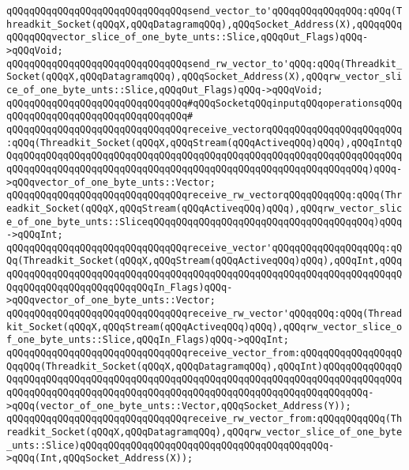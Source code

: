 \verb|qQQqqQQqqQQqqQQqqQQqqQQqqQQqqQQqsend_vector_to'qQQqqQQqqQQqqQQq:qQQq(Threadkit_Socket(qQQqX,qQQqDatagramqQQq),qQQqSocket_Address(X),qQQqqQQqqQQqqQQqvector_slice_of_one_byte_unts::Slice,qQQqOut_Flags)qQQq->qQQqVoid;|\newline
\verb|qQQqqQQqqQQqqQQqqQQqqQQqqQQqqQQqsend_rw_vector_to'qQQq:qQQq(Threadkit_Socket(qQQqX,qQQqDatagramqQQq),qQQqSocket_Address(X),qQQqrw_vector_slice_of_one_byte_unts::Slice,qQQqOut_Flags)qQQq->qQQqVoid;|\newline
\newline
\verb|qQQqqQQqqQQqqQQqqQQqqQQqqQQqqQQq#qQQqSocketqQQqinputqQQqoperationsqQQq|\newline
\verb|qQQqqQQqqQQqqQQqqQQqqQQqqQQqqQQq#|\newline
\verb|qQQqqQQqqQQqqQQqqQQqqQQqqQQqqQQqreceive_vectorqQQqqQQqqQQqqQQqqQQqqQQq:qQQq(Threadkit_Socket(qQQqX,qQQqStream(qQQqActiveqQQq)qQQq),qQQqIntqQQqqQQqqQQqqQQqqQQqqQQqqQQqqQQqqQQqqQQqqQQqqQQqqQQqqQQqqQQqqQQqqQQqqQQqqQQqqQQqqQQqqQQqqQQqqQQqqQQqqQQqqQQqqQQqqQQqqQQqqQQqqQQqqQQqqQQq)qQQq->qQQqvector_of_one_byte_unts::Vector;|\newline
\verb|qQQqqQQqqQQqqQQqqQQqqQQqqQQqqQQqreceive_rw_vectorqQQqqQQqqQQq:qQQq(Threadkit_Socket(qQQqX,qQQqStream(qQQqActiveqQQq)qQQq),qQQqrw_vector_slice_of_one_byte_unts::SliceqQQqqQQqqQQqqQQqqQQqqQQqqQQqqQQqqQQqqQQq)qQQq->qQQqInt;|\newline
\verb|qQQqqQQqqQQqqQQqqQQqqQQqqQQqqQQqreceive_vector'qQQqqQQqqQQqqQQqqQQq:qQQq(Threadkit_Socket(qQQqX,qQQqStream(qQQqActiveqQQq)qQQq),qQQqInt,qQQqqQQqqQQqqQQqqQQqqQQqqQQqqQQqqQQqqQQqqQQqqQQqqQQqqQQqqQQqqQQqqQQqqQQqqQQqqQQqqQQqqQQqqQQqqQQqqQQqIn_Flags)qQQq->qQQqvector_of_one_byte_unts::Vector;|\newline
\verb|qQQqqQQqqQQqqQQqqQQqqQQqqQQqqQQqreceive_rw_vector'qQQqqQQq:qQQq(Threadkit_Socket(qQQqX,qQQqStream(qQQqActiveqQQq)qQQq),qQQqrw_vector_slice_of_one_byte_unts::Slice,qQQqIn_Flags)qQQq->qQQqInt;|\newline
\newline
\verb|qQQqqQQqqQQqqQQqqQQqqQQqqQQqqQQqreceive_vector_from:qQQqqQQqqQQqqQQqqQQqqQQq(Threadkit_Socket(qQQqX,qQQqDatagramqQQq),qQQqInt)qQQqqQQqqQQqqQQqqQQqqQQqqQQqqQQqqQQqqQQqqQQqqQQqqQQqqQQqqQQqqQQqqQQqqQQqqQQqqQQqqQQqqQQqqQQqqQQqqQQqqQQqqQQqqQQqqQQqqQQqqQQqqQQqqQQqqQQqqQQqqQQqqQQq->qQQq(vector_of_one_byte_unts::Vector,qQQqSocket_Address(Y));|\newline
\verb|qQQqqQQqqQQqqQQqqQQqqQQqqQQqqQQqreceive_rw_vector_from:qQQqqQQqqQQq(Threadkit_Socket(qQQqX,qQQqDatagramqQQq),qQQqrw_vector_slice_of_one_byte_unts::Slice)qQQqqQQqqQQqqQQqqQQqqQQqqQQqqQQqqQQqqQQqqQQq->qQQq(Int,qQQqSocket_Address(X));|\newline
